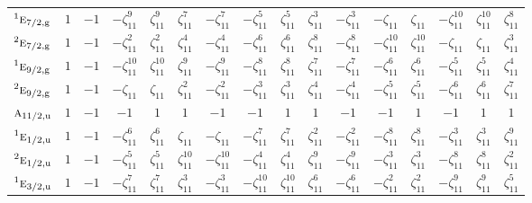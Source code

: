 \documentclass[10pt,a4paper]{article}
\numberwithin{equation}{section}
\newcommand{\irr}[1]{\text{\normalfont\scshape #1}}
\newcommand{\conjpair}[1]{{}^{#1}}
\newcommand{\ptag}[1]{\mathrm{#1}}
\newcommand{\rootunity}[1]{\zeta_{#1}}
\begin{document}
{\begin{longtable}{@{}lccccccccccccccc@{}}
$\conjpair{1}\irr{e}_{7/2,\ptag{g}}$ & $1$ & $-1$ & $-\rootunity{11}^{9}$ & $\rootunity{11}^{9}$ & $\rootunity{11}^{7}$ & $-\rootunity{11}^{7}$ & $-\rootunity{11}^{5}$ & $\rootunity{11}^{5}$ & $\rootunity{11}^{3}$ & $-\rootunity{11}^{3}$ & $-\rootunity{11}$ & $\rootunity{11}$ & $-\rootunity{11}^{10}$ & $\rootunity{11}^{10}$ & $\rootunity{11}^{8}$\\
$\conjpair{2}\irr{e}_{7/2,\ptag{g}}$ & $1$ & $-1$ & $-\rootunity{11}^{2}$ & $\rootunity{11}^{2}$ & $\rootunity{11}^{4}$ & $-\rootunity{11}^{4}$ & $-\rootunity{11}^{6}$ & $\rootunity{11}^{6}$ & $\rootunity{11}^{8}$ & $-\rootunity{11}^{8}$ & $-\rootunity{11}^{10}$ & $\rootunity{11}^{10}$ & $-\rootunity{11}$ & $\rootunity{11}$ & $\rootunity{11}^{3}$\\
$\conjpair{1}\irr{e}_{9/2,\ptag{g}}$ & $1$ & $-1$ & $-\rootunity{11}^{10}$ & $\rootunity{11}^{10}$ & $\rootunity{11}^{9}$ & $-\rootunity{11}^{9}$ & $-\rootunity{11}^{8}$ & $\rootunity{11}^{8}$ & $\rootunity{11}^{7}$ & $-\rootunity{11}^{7}$ & $-\rootunity{11}^{6}$ & $\rootunity{11}^{6}$ & $-\rootunity{11}^{5}$ & $\rootunity{11}^{5}$ & $\rootunity{11}^{4}$\\
$\conjpair{2}\irr{e}_{9/2,\ptag{g}}$ & $1$ & $-1$ & $-\rootunity{11}$ & $\rootunity{11}$ & $\rootunity{11}^{2}$ & $-\rootunity{11}^{2}$ & $-\rootunity{11}^{3}$ & $\rootunity{11}^{3}$ & $\rootunity{11}^{4}$ & $-\rootunity{11}^{4}$ & $-\rootunity{11}^{5}$ & $\rootunity{11}^{5}$ & $-\rootunity{11}^{6}$ & $\rootunity{11}^{6}$ & $\rootunity{11}^{7}$\\
$\irr{a}_{11/2,\ptag{u}}$ & $1$ & $-1$ & $-1$ & $1$ & $1$ & $-1$ & $-1$ & $1$ & $1$ & $-1$ & $-1$ & $1$ & $-1$ & $1$ & $1$\\
$\conjpair{1}\irr{e}_{1/2,\ptag{u}}$ & $1$ & $-1$ & $-\rootunity{11}^{6}$ & $\rootunity{11}^{6}$ & $\rootunity{11}$ & $-\rootunity{11}$ & $-\rootunity{11}^{7}$ & $\rootunity{11}^{7}$ & $\rootunity{11}^{2}$ & $-\rootunity{11}^{2}$ & $-\rootunity{11}^{8}$ & $\rootunity{11}^{8}$ & $-\rootunity{11}^{3}$ & $\rootunity{11}^{3}$ & $\rootunity{11}^{9}$\\
$\conjpair{2}\irr{e}_{1/2,\ptag{u}}$ & $1$ & $-1$ & $-\rootunity{11}^{5}$ & $\rootunity{11}^{5}$ & $\rootunity{11}^{10}$ & $-\rootunity{11}^{10}$ & $-\rootunity{11}^{4}$ & $\rootunity{11}^{4}$ & $\rootunity{11}^{9}$ & $-\rootunity{11}^{9}$ & $-\rootunity{11}^{3}$ & $\rootunity{11}^{3}$ & $-\rootunity{11}^{8}$ & $\rootunity{11}^{8}$ & $\rootunity{11}^{2}$\\
$\conjpair{1}\irr{e}_{3/2,\ptag{u}}$ & $1$ & $-1$ & $-\rootunity{11}^{7}$ & $\rootunity{11}^{7}$ & $\rootunity{11}^{3}$ & $-\rootunity{11}^{3}$ & $-\rootunity{11}^{10}$ & $\rootunity{11}^{10}$ & $\rootunity{11}^{6}$ & $-\rootunity{11}^{6}$ & $-\rootunity{11}^{2}$ & $\rootunity{11}^{2}$ & $-\rootunity{11}^{9}$ & $\rootunity{11}^{9}$ & $\rootunity{11}^{5}$\\

\end{longtable}}
\end{document}
